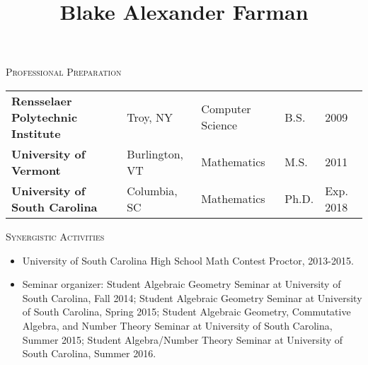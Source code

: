 \documentclass[11pt]{article}
\title{Blake Alexander Farman}
\date{}
\begin{document}
\maketitle

\begin{center}
  \textsc{Professional Preparation}
\end{center}
\begin{center}
\begin{tabular}{lllll}
  \textbf{Rensselaer Polytechnic Institute} & Troy, NY & Computer Science & B.S. & 2009\\
  \textbf{University of Vermont} & Burlington, VT & Mathematics & M.S. & 2011\\
  \textbf{University of South Carolina} & Columbia, SC & Mathematics & Ph.D. & Exp. 2018
\end{tabular}
\end{center}

\begin{center}
  \textsc{Synergistic Activities}
  \begin{itemize}
  \item
    University of South Carolina High School Math Contest Proctor, 2013-2015.
  \item
    Seminar organizer: Student Algebraic Geometry Seminar at University of South Carolina, Fall 2014; Student Algebraic Geometry Seminar at University of South Carolina, Spring 2015; Student Algebraic Geometry, Commutative Algebra, and Number Theory Seminar at University of South Carolina, Summer 2015; Student Algebra/Number Theory Seminar at University of South Carolina, Summer 2016.
  \end{itemize}
\end{center}
\end{document}
